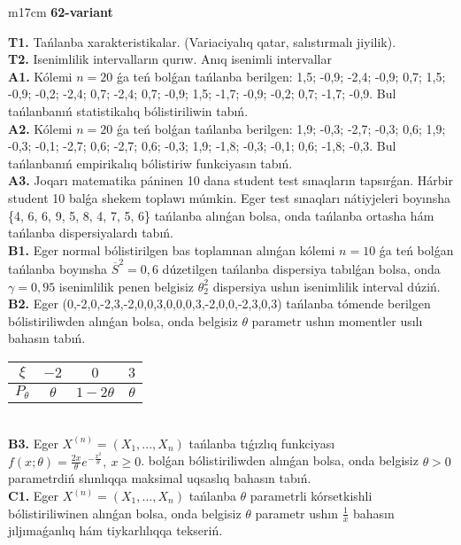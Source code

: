 \documentclass{article}
\begin{document}
\begin{tabular}{m{17cm}}
\textbf{62-variant}
\newline

\textbf{T1.} 
Tańlanba xarakteristikalar. (Variaciyalıq qatar, salıstırmalı jiyilik).
 \\
\textbf{T2.} 
Isenimlilik intervalların qurıw. Anıq isenimli intervallar
 \\
\textbf{A1.} 
Kólemi \(n = 20\) ǵa teń bolǵan tańlanba berilgen: 1,5; -0,9; -2,4; -0,9; 0,7; 1,5; -0,9; -0,2; -2,4; 0,7; -2,4; 0,7; -0,9; 1,5; -1,7; -0,9; -0,2; 0,7; -1,7; -0,9. Bul tańlanbanıń statistikalıq bólistiriliwin tabıń.
 \\
\textbf{A2.} 
Kólemi \(n = 20\) ǵa teń bolǵan tańlanba berilgen: 1,9; -0,3; -2,7; -0,3; 0,6; 1,9; -0,3; -0,1; -2,7; 0,6; -2,7; 0,6; -0,3; 1,9; -1,8; -0,3; -0,1; 0,6; -1,8; -0,3. Bul tańlanbanıń empirikalıq bólistiriw funkciyasın tabıń.
 \\
\textbf{A3.} 
Joqarı matematika páninen 10 dana student test sınaqların tapsırǵan. Hárbir student 10 balǵa shekem toplawı múmkin. Eger test sınaqları nátiyjeleri boyınsha \{4, 6, 6, 9, 5, 8, 4, 7, 5, 6\} tańlanba alınǵan bolsa, onda tańlanba ortasha hám tańlanba dispersiyalardı tabıń.
 \\
\textbf{B1.} 
Eger normal bólistirilgen bas toplamnan alınǵan kólemi \(n = 10\) ǵa teń bolǵan tańlanba boyınsha \({\overline{S}}^{2} = 0,6\) dúzetilgen tańlanba dispersiya tabılǵan bolsa, onda \(\gamma = 0,95\) isenimlilik penen belgisiz \(\theta_{2}^{2}\) dispersiya ushın isenimlilik interval dúziń.
 \\
\textbf{B2.} 
Eger (0,-2,0,-2,3,-2,0,0,3,0,0,0,3,-2,0,0,-2,3,0,3) tańlanba tómende berilgen bólistiriliwden alınǵan bolsa, onda belgisiz \(\theta\) parametr ushın momentler usılı bahasın tabıń.
\begin{tabular}{|c|c|c|c|}
  \hline
$\xi$ & $- 2$  & $0$  & $3$ \\
\hline
\(P_{\theta}\) & \(\theta\) & \(1 - 2\theta\) & \(\theta\) \\
\hline
\end{tabular}
 \\
\textbf{B3.} 
Eger \(X^{(n)} = \left( X_{1},...,X_{n} \right)\) tańlanba tıǵızlıq funkciyası \(f(x;\theta) = \frac{2x}{\theta}e^{- \frac{x^{2}}{\theta}},\ x \geq 0\). bolǵan bólistiriliwden alınǵan bolsa, onda belgisiz \(\theta > 0\) parametrdiń shınlıqqa maksimal uqsaslıq bahasın tabıń.
 \\
\textbf{C1.} 
Eger \(X^{(n)} = \left( X_{1},...,X_{n} \right)\) tańlanba \(\theta\) parametrli kórsetkishli bólistiriliwinen alınǵan bolsa, onda belgisiz \(\theta\) parametr ushın \(\frac{1}{\overline{x}}\) bahasın jıljımaǵanlıq hám tiykarlılıqqa tekseriń.

\end{tabular}
\end{document}
